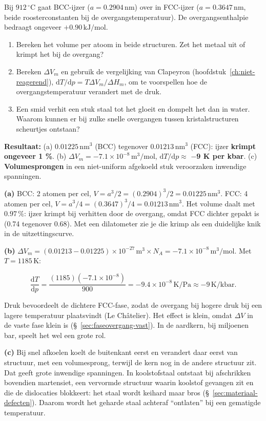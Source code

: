 \begin{oefening}
Bij \(912\,^\circ\mathrm{C}\) gaat BCC-ijzer (\(a = 0.2904\,\mathrm{nm}\)) over in FCC-ijzer (\(a = 0.3647\,\mathrm{nm}\), beide roosterconstanten bij de overgangstemperatuur). De overgangsenthalpie bedraagt ongeveer \(+0.90\,\mathrm{kJ/mol}\).

\begin{enumerate}
\item[(a)]
  Bereken het volume per atoom in beide structuren. Zet het metaal uit of krimpt het bij de overgang?
\item[(b)]
  Bereken \(\Delta V_m\) en gebruik de vergelijking van Clapeyron (hoofdstuk~\ref{ch:niet-reagerend}), \(\mathrm{d}T/\mathrm{d}p = T\Delta V_m/\Delta H_m\), om te voorspellen hoe de overgangstemperatuur verandert met de druk.
\item[(c)]
  Een smid verhit een stuk staal tot het gloeit en dompelt het dan in water. Waarom kunnen er bij zulke snelle overgangen tussen kristalstructuren scheurtjes ontstaan?
\end{enumerate}
\end{oefening}
\begin{oplossing}
\textbf{Resultaat:} (a) \(0.01225\,\mathrm{nm^3}\) (BCC) tegenover \(0.01213\,\mathrm{nm^3}\) (FCC): ijzer \textbf{krimpt ongeveer 1 \%}. (b) \(\Delta V_m = -7.1\times10^{-8}\,\mathrm{m^3/mol}\), \(\mathrm{d}T/\mathrm{d}p \approx\) \textbf{\ensuremath{-}9 K per kbar}. (c) \textbf{Volumesprongen} in een niet-uniform afgekoeld stuk veroorzaken inwendige spanningen.

\textbf{(a)} BCC: 2 atomen per cel, \(V = a^3/2 = (0.2904)^3/2 = 0.01225\,\mathrm{nm^3}\). FCC: 4 atomen per cel, \(V = a^3/4 = (0.3647)^3/4 = 0.01213\,\mathrm{nm^3}\). Het volume daalt met \(0.97\,\%\): ijzer krimpt bij verhitten door de overgang, omdat FCC dichter gepakt is (0.74 tegenover 0.68). Met een dilatometer zie je die krimp als een duidelijke knik in de uitzettingscurve.

\textbf{(b)} \(\Delta V_m = (0.01213 - 0.01225)\times10^{-27}\,\mathrm{m^3} \times N_A = -7.1\times10^{-8}\,\mathrm{m^3/mol}\). Met \(T = 1185\,\mathrm{K}\):

\[
\frac{\mathrm{d}T}{\mathrm{d}p} = \frac{(1185)(-7.1\times10^{-8})}{900} = -9.4\times10^{-8}\,\mathrm{K/Pa} \approx -9\,\mathrm{K/kbar}.
\]

Druk bevoordeelt de dichtere FCC-fase, zodat de overgang bij hogere druk bij een lagere temperatuur plaatsvindt (Le Châtelier). Het effect is klein, omdat \(\Delta V\) in de vaste fase klein is (\S~\ref{sec:faseovergang-vast}). In de aardkern, bij miljoenen bar, speelt het wel een grote rol.

\textbf{(c)} Bij snel afkoelen koelt de buitenkant eerst en verandert daar eerst van structuur, met een volumesprong, terwijl de kern nog in de andere structuur zit. Dat geeft grote inwendige spanningen. In koolstofstaal ontstaat bij afschrikken bovendien martensiet, een vervormde structuur waarin koolstof gevangen zit en die de dislocaties blokkeert: het staal wordt keihard maar bros (\S~\ref{sec:materiaal-defecten}). Daarom wordt het geharde staal achteraf ``ontlaten'' bij een gematigde temperatuur.
\end{oplossing}

